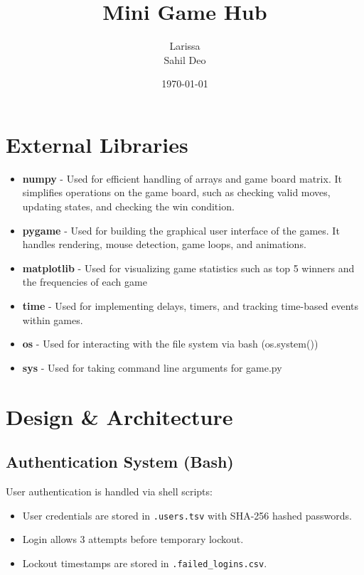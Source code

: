 \documentclass[12pt]{article}
\title{\textbf{Mini Game Hub}}
\author{Larissa \\ Sahil Deo}
\date{\today}
\begin{document}
\maketitle
\tableofcontents
\clearpage
\section{External Libraries}
\begin{itemize}
\item \textbf{numpy} - Used for efficient handling of arrays and game board matrix. It simplifies operations on the game board, such as checking valid moves, updating states, and checking the win condition.

\item \textbf{pygame} - Used for building the graphical user interface of the games. It handles rendering, mouse detection, game loops, and animations.

\item \textbf{matplotlib} - Used for visualizing game statistics such as top 5 winners and the frequencies of each game

\item \textbf{time} - Used for implementing delays, timers, and tracking time-based events within games.

\item \textbf{os} - Used for interacting with the file system via bash (os.system())

\item \textbf{sys} - Used for taking command line arguments for game.py 
\end{itemize}

\section{Design \& Architecture}

\subsection{Authentication System (Bash)}
User authentication is handled via shell scripts:
\begin{itemize}
    \item User credentials are stored in \texttt{.users.tsv} with SHA-256 hashed passwords.
    \item Login allows 3 attempts before temporary lockout.
    \item Lockout timestamps are stored in \texttt{.failed\_logins.csv}.
\end{itemize}
\end{document}
